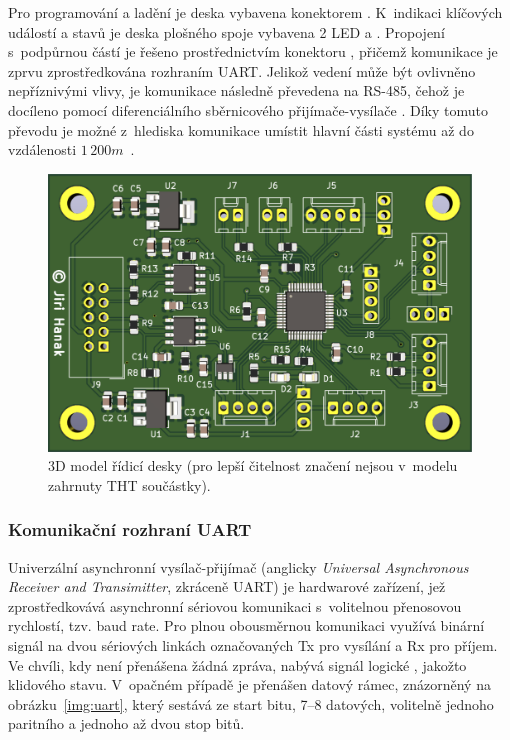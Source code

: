             Pro programování a ladění je deska vybavena konektorem . K~indikaci klíčových událostí a stavů je deska plošného spoje vybavena 2 LED  a . Propojení s~podpůrnou částí je řešeno prostřednictvím konektoru , přičemž komunikace je zprvu zprostředkována rozhraním UART. Jelikož vedení může být ovlivněno nepříznivými vlivy, je komunikace následně převedena na RS-485, čehož je docíleno pomocí diferenciálního sběrnicového přijímače-vysílače . Díky tomuto převodu je možné z~hlediska komunikace umístit hlavní části systému až do vzdálenosti $1\,200\unit{m}$~\cite{book:embedded_1}. 

            \begin{figure}[h]
                \centering
                \includegraphics[width=0.8\linewidth]{obrazky-figures/main_board_3D.pdf}
                \caption{3D model řídicí desky (pro lepší čitelnost značení nejsou v~modelu zahrnuty THT součástky).}
                \label{img:main_board_3D}
            \end{figure}

            \subsubsection{Komunikační rozhraní UART}
                Univerzální asynchronní vysílač-přijímač (anglicky \textit{Universal Asynchronous Receiver and Transimitter}, zkráceně UART) je hardwarové zařízení, jež zprostředkovává asynchronní sériovou komunikaci s~volitelnou přenosovou rychlostí, tzv. baud rate. Pro plnou obousměrnou komunikaci využívá binární signál na dvou sériových linkách označovaných Tx pro vysílání a Rx pro příjem. Ve chvíli, kdy není přenášena žádná zpráva, nabývá signál logické , jakožto klidového stavu. V~opačném případě je přenášen datový rámec, znázorněný na obrázku~\ref{img:uart}, který sestává ze start bitu, 7--8 datových, volitelně jednoho paritního a jednoho až dvou stop bitů.~\cite{book:embedded_1}

